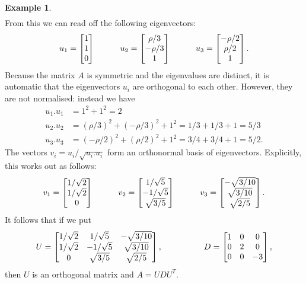 \documentclass[reqno]{amsart}
\theoremstyle{definition}
\newtheorem{example}[theorem]{Example}
\begin{document}
\begin{example}
\begin{align*}
 \end{align*}
 From this we can read off the following eigenvectors:
 \[
    u_1 = \left[\begin{matrix} 1\\1\\0\end{matrix}\right] \hspace{3em}
    u_2 = \left[\begin{matrix} \rho/3 \\ -\rho/3\\ 1\end{matrix}\right] \hspace{3em}
    u_3 = \left[\begin{matrix} -\rho/2\\ \rho/2 \\ 1 \end{matrix}\right]. 
 \]
 Because the matrix $A$ is symmetric and the eigenvalues are distinct,
 it is automatic that the eigenvectors $u_i$ are orthogonal to each
 other.  However, they are not normalised: instead we have
 \begin{align*}
    u_1.u_1 &= 1^2+1^2 = 2 \\
    u_2.u_2 &= (\rho/3)^2 + (-\rho/3)^2 + 1^2 
             = 1/3 + 1/3 + 1 = 5/3 \\
    u_3.u_3 &= (-\rho/2)^2 + (\rho/2)^2 + 1^2
             = 3/4 + 3/4 + 1 = 5/2.
 \end{align*}
 The vectors $v_i=u_i/\sqrt{u_i.u_i}$ form an orthonormal basis of
 eigenvectors.  Explicitly, this works out as follows:
 \[ 
   v_1 = \left[\begin{matrix} 1/\sqrt{2} \\ 1/\sqrt{2} \\ 0 \end{matrix}\right]
   \hspace{3em}
   v_2 = \left[\begin{matrix} 1/\sqrt{5} \\ -1/\sqrt{5} \\ \sqrt{3/5} \end{matrix}\right]
   \hspace{3em}
   v_3 = \left[\begin{matrix} -\sqrt{3/10} \\ \sqrt{3/10} \\ \sqrt{2/5} \end{matrix}\right].
 \]
 It follows that if we put 
 \[ 
  U = \left[\begin{matrix} 
       1/\sqrt{2} &  1/\sqrt{5} & -\sqrt{3/10} \\
       1/\sqrt{2} & -1/\sqrt{5} &  \sqrt{3/10} \\
       0          &  \sqrt{3/5} &  \sqrt{2/5} 
      \end{matrix}\right],
  \hspace{5em}
  D = \left[\begin{matrix} 
       1 & 0 & 0 \\ 0 & 2 & 0 \\ 0 & 0 & -3 
      \end{matrix}\right],
 \]
 then $U$ is an orthogonal matrix and $A=UDU^T$.
\end{example}
\end{document}
